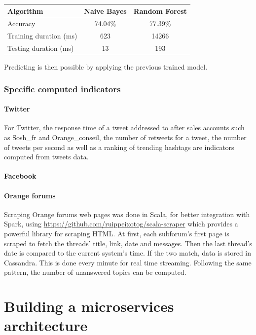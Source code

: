 \documentclass[11pt]{article}
\begin{document}
\begin{center}
\begin{tabular}{|l|c|c|}
  \hline
  Algorithm & Naive Bayes & Random Forest \\
  \hline
  Accuracy & 74.04\% & 77.39\% \\
  Training duration (ms) & 623 & 14266 \\
  Testing duration (ms) & 13 & 193 \\
  \hline
\end{tabular}
\end{center}

Predicting is then possible by applying the previous trained model.

\subsubsection{Specific computed indicators}

\paragraph{Twitter}

For Twitter, the response time of a tweet addressed to after sales accounts such as Sosh\_fr and Orange\_conseil, the number of retweets for a tweet, the number of tweets per second as well as a ranking of trending hashtags are indicators computed from tweets data.

\paragraph{Facebook}

\paragraph{Orange forums}

Scraping Orange forums web pages was done in Scala, for better integration with Spark, using \url{https://github.com/ruippeixotog/scala-scraper} which provides a powerful library for scraping HTML. At first, each subforum's first page is scraped to fetch the threads' title, link, date and messages. Then the last thread's date is compared to the current system's time. If the two match, data is stored in Cassandra. This is done every minute for real time streaming. Following the same pattern, the number of unanswered topics can be computed. 

\section{Building a microservices architecture}
\end{document}
